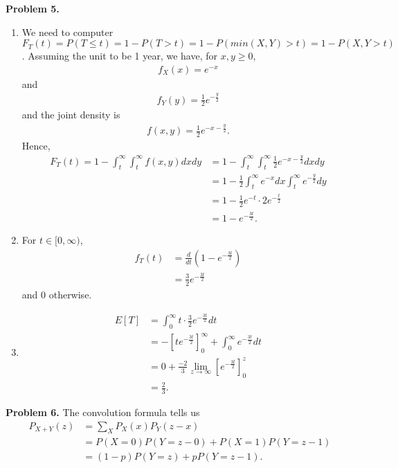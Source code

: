 \documentclass{article}
\begin{document}
\textbf{Problem 5.}
\begin{enumerate}[label={(\alph*)}]
    \item 
    We need to computer $F_T(t)=P(T\le t)=1-P(T>t)=1-P(min(X,Y)>t)=1-P(X,Y>t)$. Assuming the unit to be 1 year, we have, for $x,y\ge 0$,
    \begin{align}
        f_X(x)=e^{-x}
    \end{align}
    and
    \begin{align}
        f_Y(y)=\frac{1}{2}e^{-\frac{y}{2}}
    \end{align}
    and the joint density is 
    \begin{align}
        f(x,y)=\frac{1}{2}e^{-x-\frac{y}{2}}.
    \end{align}
    Hence, 
    \begin{align}
        F_T(t)=1-\int_{t}^{\infty}\int_{t}^{\infty}f(x,y)dxdy & = 1-\int_{t}^{\infty}\int_{t}^{\infty}\frac{1}{2}e^{-x-\frac{y}{2}}dxdy \\
        & = 1-\frac{1}{2}\int_{t}^{\infty}e^{-x}dx\int_{t}^{\infty}e^{-\frac{y}{2}}dy \\
        & = 1-\frac{1}{2}e^{-t}\cdot 2e^{-\frac{t}{2}} \\
        & = 1-e^{-\frac{3t}{2}}. 
    \end{align}

    \item
    For $t\in [0,\infty)$,
    \begin{align}
        f_T(t)&=\frac{d}{dt}\left(1-e^{-\frac{3t}{2}}\right) \\
        &=\frac{3}{2}e^{-\frac{3t}{2}}
    \end{align}
    and 0 otherwise.
    \item 
    \begin{align}
        E[T]&=\int_{0}^{\infty}t\cdot \frac{3}{2}e^{-\frac{3t}{2}}dt \\
        &=-\left[te^{-\frac{3t}{2}}\right]_{0}^{\infty}+\int_{0}^{\infty}e^{-\frac{3t}{2}}dt \\
        & = 0+\frac{-2}{3}\lim_{z\rightarrow\infty}\left[e^{-\frac{3t}{2}}\right]_0^z \\
        & = \frac{2}{3}.
    \end{align}
\end{enumerate}
\bigbreak

\textbf{Problem 6.}
The convolution formula tells us
\begin{align}
    P_{X+Y}(z) & = \sum_{X}P_X(x)P_Y(z-x) \\
    & = P(X=0)P(Y=z-0)+P(X=1)P(Y=z-1) \\
    & = (1-p)P(Y=z)+pP(Y=z-1).
\end{align}
\end{document}
